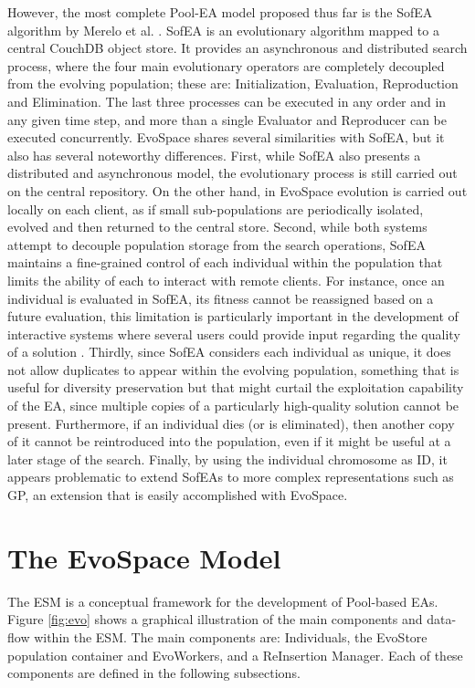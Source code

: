 However, the most complete Pool-EA model proposed thus far is the SofEA algorithm by Merelo et al. \cite{sofea1,sofea2,sofea3}.
SofEA is an evolutionary algorithm mapped to a central CouchDB object store. It provides an asynchronous and distributed search process,
where the four main evolutionary operators are completely decoupled from the evolving population; these are: Initialization, Evaluation, Reproduction and Elimination.
The last three processes can be executed in any order and in any given time step, and more than a single Evaluator and Reproducer can be
executed concurrently.
EvoSpace shares several similarities with SofEA, but it also has several noteworthy differences.
First, while SofEA also presents a distributed and asynchronous model, the evolutionary process is still carried out on the central repository.
On the other hand, in EvoSpace evolution is carried out locally on each client, as if small sub-populations are periodically isolated, evolved and then returned to the central store.
Second, while both systems attempt to decouple population storage from the search operations, SofEA maintains a fine-grained control of each individual
within the population that limits the ability of each to interact with remote clients.
For instance, once an individual is evaluated in SofEA, its fitness cannot be reassigned based on a future evaluation,
this limitation is particularly important in the development of interactive systems where several users could provide input regarding the quality of a solution \cite{Musart}.
Thirdly, since SofEA considers each individual as unique, it does not allow duplicates to appear within the evolving population, something that is useful for diversity preservation but that might curtail the exploitation capability of the EA, since multiple copies of a particularly high-quality solution cannot be present.
Furthermore, if an individual dies (or is eliminated), then another copy of it cannot be reintroduced into the population,
even if it might be useful at a later stage of the search.
Finally, by using the individual chromosome as ID, it appears problematic to extend SofEAs to more complex representations such as GP,
an extension that is easily accomplished with EvoSpace.

\section{The EvoSpace Model} %
\label{sec:evospace}
The ESM is a conceptual framework for the development of Pool-based EAs. Figure \ref{fig:evo} shows a graphical illustration of the main components and data-flow within the ESM. The main components are: Individuals, the EvoStore population container and EvoWorkers,
and a ReInsertion Manager. Each of these components are defined in the following subsections.

